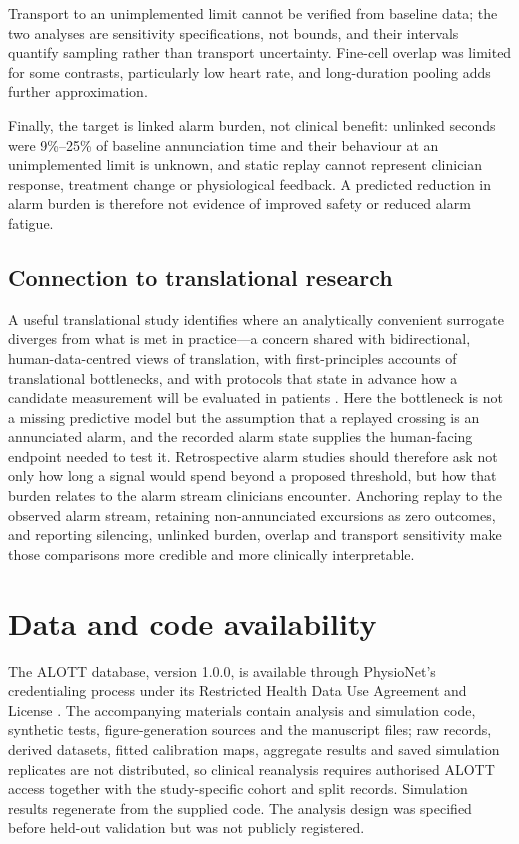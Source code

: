 \documentclass[11pt,letterpaper]{article}
\begin{document}
Transport to an unimplemented limit cannot be verified from baseline data; the two analyses are sensitivity specifications, not bounds, and their intervals quantify sampling rather than transport uncertainty. Fine-cell overlap was limited for some contrasts, particularly low heart rate, and long-duration pooling adds further approximation.

Finally, the target is linked alarm burden, not clinical benefit: unlinked seconds were 9\%--25\% of baseline annunciation time and their behaviour at an unimplemented limit is unknown, and static replay cannot represent clinician response, treatment change or physiological feedback. A predicted reduction in alarm burden is therefore not evidence of improved safety or reduced alarm fatigue.

\subsection{Connection to translational research}

A useful translational study identifies where an analytically convenient surrogate diverges from what is met in practice---a concern shared with bidirectional, human-data-centred views of translation, with first-principles accounts of translational bottlenecks, and with protocols that state in advance how a candidate measurement will be evaluated in patients \citep{liang2026paradigm,clay2026firstprinciples,gin2026immunoassay}. Here the bottleneck is not a missing predictive model but the assumption that a replayed crossing is an annunciated alarm, and the recorded alarm state supplies the human-facing endpoint needed to test it. Retrospective alarm studies should therefore ask not only how long a signal would spend beyond a proposed threshold, but how that burden relates to the alarm stream clinicians encounter. Anchoring replay to the observed alarm stream, retaining non-annunciated excursions as zero outcomes, and reporting silencing, unlinked burden, overlap and transport sensitivity make those comparisons more credible and more clinically interpretable.



\section*{Data and code availability}
The ALOTT database, version 1.0.0, is available through PhysioNet's credentialing process under its Restricted Health Data Use Agreement and License \citep{alott2025,goldberger2000physionet,pollard2026physionet}. The accompanying materials contain analysis and simulation code, synthetic tests, figure-generation sources and the manuscript files; raw records, derived datasets, fitted calibration maps, aggregate results and saved simulation replicates are not distributed, so clinical reanalysis requires authorised ALOTT access together with the study-specific cohort and split records. Simulation results regenerate from the supplied code. The analysis design was specified before held-out validation but was not publicly registered.
\end{document}
